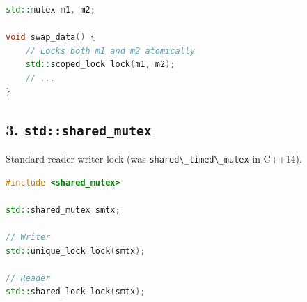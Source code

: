 \begin{lstlisting}[language={C++}]
std::mutex m1, m2;

void swap_data() {
    // Locks both m1 and m2 atomically
    std::scoped_lock lock(m1, m2);
    // ...
}
\end{lstlisting}

\hypertarget{stdshared_mutex}{%
\subsection{\texorpdfstring{3.
\texttt{std::shared\_mutex}}{3. std::shared\_mutex}}\label{stdshared_mutex}}

Standard reader-writer lock (was
\passthrough{\lstinline!shared\_timed\_mutex!} in C++14).

\begin{lstlisting}[language={C++}]
#include <shared_mutex>

std::shared_mutex smtx;

// Writer
std::unique_lock lock(smtx);

// Reader
std::shared_lock lock(smtx);
\end{lstlisting}

